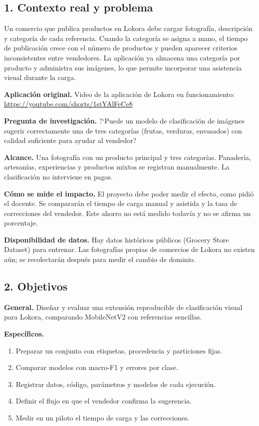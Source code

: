 \documentclass[11pt,a4paper]{article}
\begin{document}
\subsection*{1. Contexto real y problema}
\noindent Un comercio que publica productos en Lokora debe cargar fotografía, descripción y categoría de cada referencia. Cuando la categoría se asigna a mano, el tiempo de publicación crece con el número de productos y pueden aparecer criterios inconsistentes entre vendedores. La aplicación ya almacena una categoría por producto y administra sus imágenes, lo que permite incorporar una asistencia visual durante la carga.\par
\noindent \textbf{Aplicación original.} Video de la aplicación de Lokora en funcionamiento: \url{https://youtube.com/shorts/1stYAlFeCe8}\par
\noindent \textbf{Pregunta de investigación.} ?`Puede un modelo de clasificación de imágenes sugerir correctamente una de tres categorías (frutas, verduras, envasados) con calidad suficiente para ayudar al vendedor?\par
\noindent \textbf{Alcance.} Una fotografía con un producto principal y tres categorías. Panadería, artesanías, experiencias y productos mixtos se registran manualmente. La clasificación no interviene en pagos.\par
\noindent \textbf{Cómo se mide el impacto.} El proyecto debe poder medir el efecto, como pidió el docente. Se compararán el tiempo de carga manual y asistida y la tasa de correcciones del vendedor. Este ahorro no está medido todavía y no se afirma un porcentaje.\par
\noindent \textbf{Disponibilidad de datos.} Hay datos históricos públicos (Grocery Store Dataset) para entrenar. Las fotografías propias de comercios de Lokora no existen aún; se recolectarán después para medir el cambio de dominio.\par
\subsection*{2. Objetivos}
\noindent \textbf{General.} Diseñar y evaluar una extensión reproducible de clasificación visual para Lokora, comparando MobileNetV2 con referencias sencillas.\par
\noindent \textbf{Específicos.}\par
\begin{enumerate}[nosep]
\item Preparar un conjunto con etiquetas, procedencia y particiones fijas.
\item Comparar modelos con macro-F1 y errores por clase.
\item Registrar datos, código, parámetros y modelos de cada ejecución.
\item Definir el flujo en que el vendedor confirma la sugerencia.
\item Medir en un piloto el tiempo de carga y las correcciones.
\end{enumerate}
\end{document}
